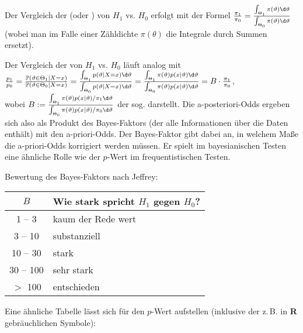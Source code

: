 \linie
\pagebreak

\begin{Bem}
    Der Vergleich der  (oder ) von $H_1$ vs. $H_0$
    erfolgt mit der Formel $\frac{\pi_1}{\pi_0}
    = \frac{\int_{\Theta_1} \pi(\theta)\d\theta}{\int_{\Theta_0} \pi(\theta)\d\theta}$
    (wobei man im Falle einer Zähldichte $\pi(\theta)$ die Integrale durch Summen ersetzt).

    Der Vergleich der  von $H_1$ vs. $H_0$ läuft analog mit\\
    $\frac{p_1}{p_0} = \frac{\PP(\theta \in \Theta_1|X=x)}{\PP(\theta \in \Theta_0|X=x)}
    = \frac{\int_{\Theta_1} p(\theta|X=x)\d\theta}
    {\int_{\Theta_0} p(\theta|X=x)\d\theta}
    = \frac{\int_{\Theta_1} \pi(\theta)p(x|\theta)\d\theta}
    {\int_{\Theta_0} \pi(\theta)p(x|\theta)\d\theta} = B \cdot \frac{\pi_1}{\pi_0}$,\\
    wobei $B := \frac{\int_{\Theta_1} \pi(\theta)p(x|\theta)/\pi_1\d\theta}
    {\int_{\Theta_0} \pi(\theta)p(x|\theta)/\pi_0\d\theta}$ der sog. 
    darstellt.
    Die a-posteriori-Odds ergeben sich also als Produkt des Bayes-Faktors
    (der alle Informationen über die Daten enthält) mit den a-priori-Odds.
    Der Bayes-Faktor gibt dabei an, in welchem Maße die a-priori-Odds korrigiert werden müssen.
    Er spielt im bayesianischen Testen eine ähnliche Rolle wie der $p$-Wert im frequentistischen
    Testen.

    Bewertung des Bayes-Faktors nach Jeffrey:

    \begin{tabular}{cl}
        \toprule
        \textbf{$B$} & \textbf{Wie stark spricht $H_1$ gegen $H_0$?}\\
        \midrule
        1 -- 3 & kaum der Rede wert\\
        \midrule
        3 -- 10 & substanziell\\
        \midrule
        10 -- 30 & stark\\
        \midrule
        30 -- 100 & sehr stark\\
        \midrule
        $>$ 100 & entschieden\\
        \bottomrule
    \end{tabular}

    Eine ähnliche Tabelle lässt sich für den $p$-Wert aufstellen
    (inklusive der z.\,B. in \textbf{R} gebräuchlichen Symbole):


\end{Bem}
